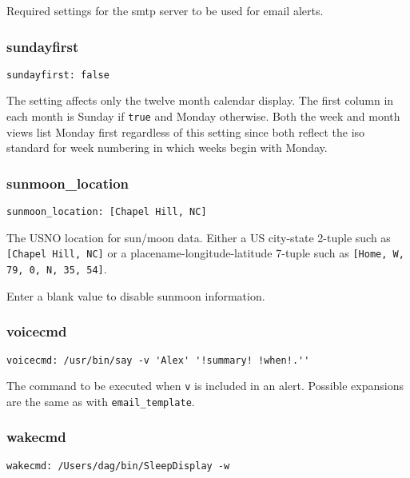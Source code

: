 \documentclass[]{article}
\begin{document}
Required settings for the smtp server to be used for email alerts.

\subsubsection{sundayfirst}

\begin{verbatim}
sundayfirst: false
\end{verbatim}

The setting affects only the twelve month calendar display. The first
column in each month is Sunday if \texttt{true} and Monday otherwise.
Both the week and month views list Monday first regardless of this
setting since both reflect the iso standard for week numbering in which
weeks begin with Monday.

\subsubsection{sunmoon\_location}

\begin{verbatim}
sunmoon_location: [Chapel Hill, NC]
\end{verbatim}

The USNO location for sun/moon data. Either a US city-state 2-tuple such
as \texttt{{[}Chapel Hill, NC{]}} or a placename-longitude-latitude
7-tuple such as \texttt{{[}Home, W, 79, 0, N, 35, 54{]}}.

Enter a blank value to disable sunmoon information.

\subsubsection{voicecmd}

\begin{verbatim}
voicecmd: /usr/bin/say -v 'Alex' '!summary! !when!.''
\end{verbatim}

The command to be executed when \texttt{v} is included in an alert.
Possible expansions are the same as with \texttt{email\_template}.

\subsubsection{wakecmd}

\begin{verbatim}
wakecmd: /Users/dag/bin/SleepDisplay -w
\end{verbatim}
\end{document}
